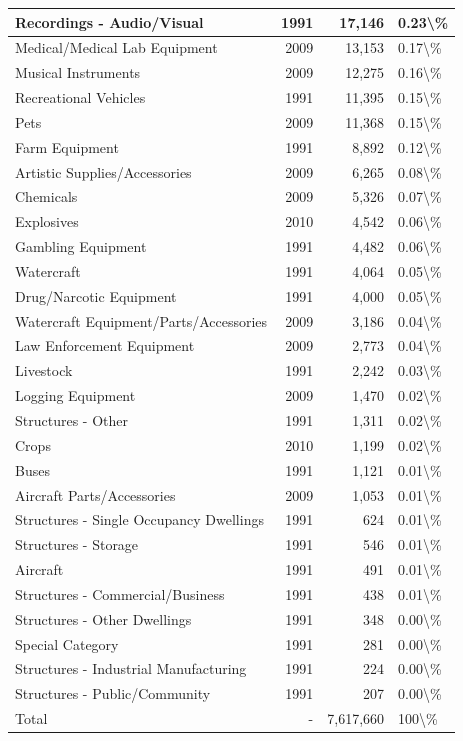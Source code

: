 \documentclass[
]{krantz}
\begin{document}
\begin{longtable}[t]{l|r|r|l}
\hline
Recordings - Audio/Visual & 1991 & 17,146 & 0.23\textbackslash{}\%\\
\hline
Medical/Medical Lab Equipment & 2009 & 13,153 & 0.17\textbackslash{}\%\\
\hline
Musical Instruments & 2009 & 12,275 & 0.16\textbackslash{}\%\\
\hline
Recreational Vehicles & 1991 & 11,395 & 0.15\textbackslash{}\%\\
\hline
Pets & 2009 & 11,368 & 0.15\textbackslash{}\%\\
\hline
Farm Equipment & 1991 & 8,892 & 0.12\textbackslash{}\%\\
\hline
Artistic Supplies/Accessories & 2009 & 6,265 & 0.08\textbackslash{}\%\\
\hline
Chemicals & 2009 & 5,326 & 0.07\textbackslash{}\%\\
\hline
Explosives & 2010 & 4,542 & 0.06\textbackslash{}\%\\
\hline
Gambling Equipment & 1991 & 4,482 & 0.06\textbackslash{}\%\\
\hline
Watercraft & 1991 & 4,064 & 0.05\textbackslash{}\%\\
\hline
Drug/Narcotic Equipment & 1991 & 4,000 & 0.05\textbackslash{}\%\\
\hline
Watercraft Equipment/Parts/Accessories & 2009 & 3,186 & 0.04\textbackslash{}\%\\
\hline
Law Enforcement Equipment & 2009 & 2,773 & 0.04\textbackslash{}\%\\
\hline
Livestock & 1991 & 2,242 & 0.03\textbackslash{}\%\\
\hline
Logging Equipment & 2009 & 1,470 & 0.02\textbackslash{}\%\\
\hline
Structures - Other & 1991 & 1,311 & 0.02\textbackslash{}\%\\
\hline
Crops & 2010 & 1,199 & 0.02\textbackslash{}\%\\
\hline
Buses & 1991 & 1,121 & 0.01\textbackslash{}\%\\
\hline
Aircraft Parts/Accessories & 2009 & 1,053 & 0.01\textbackslash{}\%\\
\hline
Structures - Single Occupancy Dwellings & 1991 & 624 & 0.01\textbackslash{}\%\\
\hline
Structures - Storage & 1991 & 546 & 0.01\textbackslash{}\%\\
\hline
Aircraft & 1991 & 491 & 0.01\textbackslash{}\%\\
\hline
Structures - Commercial/Business & 1991 & 438 & 0.01\textbackslash{}\%\\
\hline
Structures - Other Dwellings & 1991 & 348 & 0.00\textbackslash{}\%\\
\hline
Special Category & 1991 & 281 & 0.00\textbackslash{}\%\\
\hline
Structures - Industrial Manufacturing & 1991 & 224 & 0.00\textbackslash{}\%\\
\hline
Structures - Public/Community & 1991 & 207 & 0.00\textbackslash{}\%\\
\hline
Total & - & 7,617,660 & 100\textbackslash{}\%\\
\hline
\end{longtable}
\end{document}
